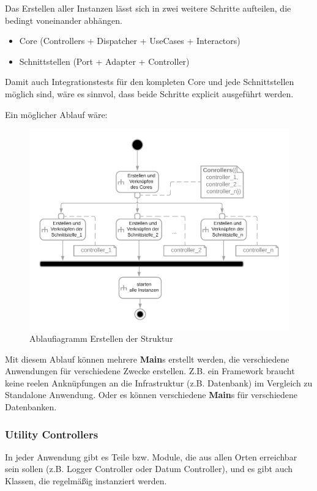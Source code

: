\documentclass{article}
\begin{document}
    Das Erstellen aller Instanzen lässt sich in zwei weitere Schritte aufteilen, die bedingt voneinander abhängen.
    \begin{itemize}
        \item Core (Controllers + Dispatcher + UseCases + Interactors)
        \item Schnittstellen (Port + Adapter + Controller)
    \end{itemize}

    Damit auch Integrationstests für den kompleten Core und jede Schnittstellen möglich sind, wäre es sinnvol, dass beide Schritte
    explicit ausgeführt werden.

    Ein möglicher Ablauf wäre:
    \begin{figure}[H]
        \centering
        \includegraphics[width=12cm]{./images/Erstellen AD.png}
         \caption[Ablaufiagramm Erstellen der Struktur]{Ablaufiagramm Erstellen der Struktur \footnotemark}
         \label{fig:ADCreate}
    \end{figure}

    Mit diesem Ablauf können mehrere \textbf{Main}s erstellt werden, die verschiedene Anwendungen für verschiedene Zwecke erstellen.
    Z.B. ein Framework braucht keine reelen Anknüpfungen an die Infrastruktur (z.B. Datenbank) im Vergleich zu Standalone Anwendung.
    Oder es können verschiedene \textbf{Main}s für verschiedene Datenbanken.

    \subsubsection{Utility Controllers}
    \label{kap:utilityControllers}
    In jeder Anwendung gibt es Teile bzw. Module, die aus allen Orten erreichbar sein sollen
    (z.B. Logger Controller oder Datum Controller), und es gibt auch Klassen, die regelmäßig instanziert werden.
\end{document}
